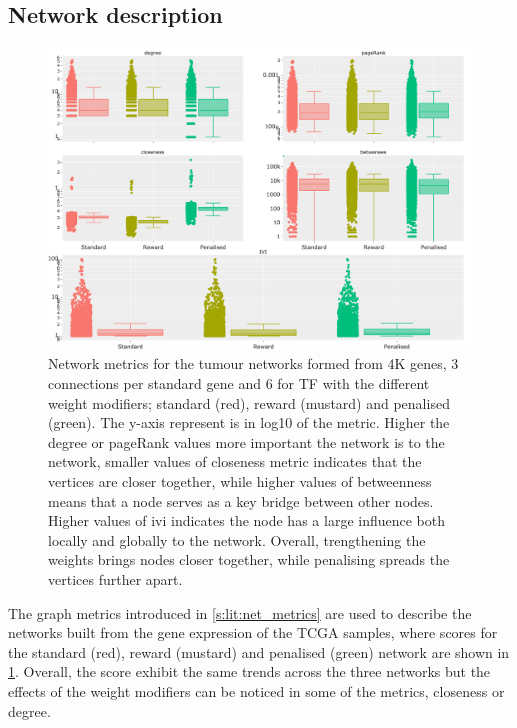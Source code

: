 \subsection{Network description} \label{s:N_I:tum_describe}

\begin{figure}[!t]  
\centering
\includegraphics[width=1.0\textwidth,keepaspectratio]{Sections/Network_I/Resources/Tum_network/NetworkMetricsComp_6TF.png}
    \caption[Tum: centrality network metrics]{Network metrics for the tumour networks formed from 4K genes, 3 connections per standard gene and 6 for TF with the different weight modifiers; standard (red), reward (mustard) and penalised (green). The y-axis represent is in log10 of the metric. Higher the degree or pageRank values more important the network is to the network, smaller values of closeness metric indicates that the vertices are closer together, while higher values of betweenness means that a node serves as a key bridge between other nodes. Higher values of \acrlong{ivi} indicates the node has a large influence both locally and globally to the network. Overall, trengthening the weights brings nodes closer together, while penalising spreads the vertices further apart.  }
    \label{fig:N_I:net_metrics_tum}
\end{figure}

The graph metrics introduced in \cref{s:lit:net_metrics} are used to describe the networks built from the gene expression of the TCGA samples, where scores for the standard (red), reward (mustard) and penalised (green) network are shown in \cref{fig:N_I:net_metrics_tum}. Overall, the score exhibit the same trends across the three networks but the effects of the weight modifiers can be noticed in some of the metrics, closeness or degree.


